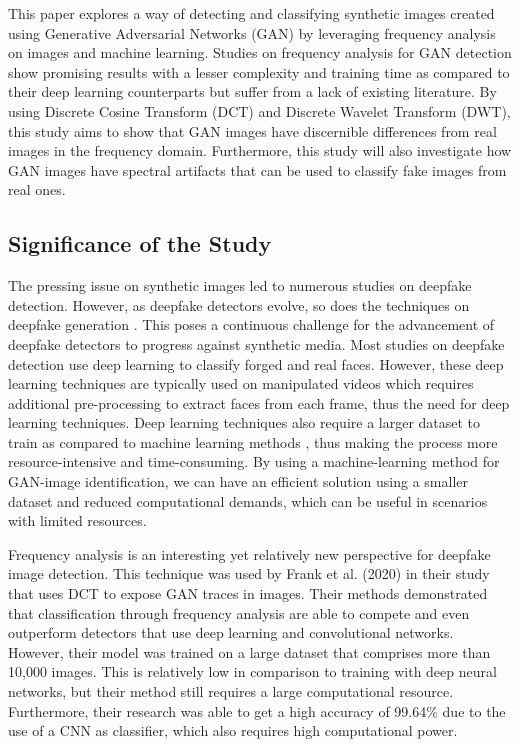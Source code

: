 \documentclass{icsthesis}
\begin{document}
\begin{mainmatter}
\par This paper explores a way of detecting and classifying synthetic images created using Generative Adversarial Networks (GAN) by leveraging frequency analysis on images and machine learning. Studies on frequency analysis for GAN detection show promising results with a lesser complexity and training time as compared to their deep learning counterparts but suffer from a lack of existing literature. By using Discrete Cosine Transform (DCT) and Discrete Wavelet Transform (DWT), this study aims to show that GAN images have discernible differences from real images in the frequency domain. Furthermore, this study will also investigate how GAN images have spectral artifacts that can be used to classify fake images from real ones. 


\subsection{Significance of the Study}

\par The pressing issue on synthetic images led to numerous studies on deepfake detection. However, as deepfake detectors evolve, so does the techniques on deepfake generation \citep{ml-conrad}. This poses a continuous challenge for the advancement of deepfake detectors to progress against synthetic media. Most studies on deepfake detection use deep learning to classify forged and real faces. However, these deep learning techniques are typically used on manipulated videos which requires additional pre-processing to extract faces from each frame, thus the need for deep learning techniques. Deep learning techniques also require a larger dataset to train as compared to machine learning methods \citep{mlvsdl}, thus making the process more resource-intensive and time-consuming. By using a machine-learning method for GAN-image identification, we can have an efficient solution using a smaller dataset and reduced computational demands, which can be useful in scenarios with limited resources. 

\par Frequency analysis is an interesting yet relatively new perspective for deepfake image detection. This technique was used by Frank et al. (2020) in their study that uses DCT to expose GAN traces in images. Their methods demonstrated that classification through frequency analysis are able to compete and even outperform detectors that use deep learning and convolutional networks. However, their model was trained on a large dataset that comprises more than 10,000 images. This is relatively low in comparison to training with deep neural networks, but their method still requires a large computational resource. Furthermore, their research was able to get a high accuracy of 99.64\% due to the use of a CNN as classifier, which also requires high computational power. 


\end{mainmatter}
\end{document}
